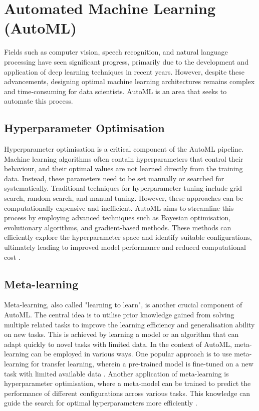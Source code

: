 \section{Automated Machine Learning (AutoML)}\label{section:automl}

Fields such as computer vision, speech recognition, and natural language processing have seen significant progress, primarily due to the development and application of deep learning techniques in recent years. However, despite these advancements, designing optimal machine learning architectures remains complex and time-consuming for data scientists. \Gls{AutoML} is an area that seeks to automate this process.  

\subsection{Hyperparameter Optimisation}\label{subsection:hyperparameter-optimization}
Hyperparameter optimisation is a critical component of the \gls{AutoML} pipeline. Machine learning algorithms often contain hyperparameters that control their behaviour, and their optimal values are not learned directly from the training data. Instead, these parameters need to be set manually or searched for systematically. Traditional techniques for hyperparameter tuning include grid search, random search, and manual tuning. However, these approaches can be computationally expensive and inefficient.
\gls{AutoML} aims to streamline this process by employing advanced techniques such as Bayesian optimisation, evolutionary algorithms, and gradient-based methods. These methods can efficiently explore the hyperparameter space and identify suitable configurations, ultimately leading to improved model performance and reduced computational cost \autocite{bergstra2011algorithms, snoek2012practical}.

\subsection{Meta-learning}\label{subsection:meta-learning}
Meta-learning, also called "learning to learn", is another crucial component of \gls{AutoML}. The central idea is to utilise prior knowledge gained from solving multiple related tasks to improve the learning efficiency and generalisation ability on new tasks. This is achieved by learning a model or an algorithm that can adapt quickly to novel tasks with limited data.
In the context of \gls{AutoML}, meta-learning can be employed in various ways. One popular approach is to use meta-learning for transfer learning, wherein a pre-trained model is fine-tuned on a new task with limited available data \autocite{pan2010survey}. Another application of meta-learning is hyperparameter optimisation, where a meta-model can be trained to predict the performance of different configurations across various tasks. This knowledge can guide the search for optimal hyperparameters more efficiently \autocite{swersky2014freeze}.